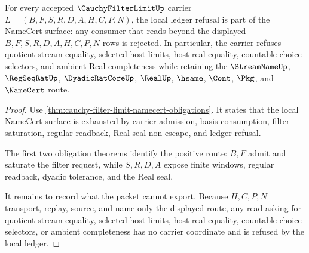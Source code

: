 \begin{theorem}
\label{thm:cauchy-filter-limit-ledger-refusal-obligation}
For every accepted $\CauchyFilterLimitUp$ carrier $L=(B,F,S,R,D,A,H,C,P,N)$, the local ledger refusal is part of the NameCert surface: any consumer that reads beyond the displayed $B,F,S,R,D,A,H,C,P,N$ rows is rejected. In particular, the carrier refuses quotient stream equality, selected host limits, host real equality, countable-choice selectors, and ambient Real completeness while retaining the $\StreamNameUp$, $\RegSeqRatUp$, $\DyadicRatCoreUp$, $\RealUp$, $\hsame$, $\Cont$, $\Pkg$, and $\NameCert$ route.
\end{theorem}
\begin{proof}
Use \autoref{thm:cauchy-filter-limit-namecert-obligations}. It states that the local NameCert surface is exhausted by carrier admission, basis consumption, filter saturation, regular readback, Real seal non-escape, and ledger refusal.

The first two obligation theorems identify the positive route: $B,F$ admit and saturate the filter request, while $S,R,D,A$ expose finite windows, regular readback, dyadic tolerance, and the Real seal.

It remains to record what the packet cannot export. Because $H,C,P,N$ transport, replay, source, and name only the displayed route, any read asking for quotient stream equality, selected host limits, host real equality, countable-choice selectors, or ambient completeness has no carrier coordinate and is refused by the local ledger.
\end{proof}

